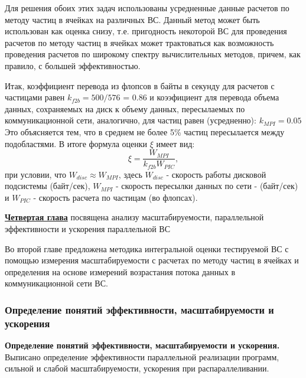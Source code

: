 Для решения обоих этих задач использованы усредненные данные расчетов по методу частиц в ячейках на различных ВС. Данный метод может быть использован как оценка снизу, т.е. пригодность некоторой ВС для проведения расчетов по методу частиц в ячейках может трактоваться как возможность проведения расчетов по широкому спектру вычислительных методов, причем, как правило, с большей эффективностью.

Итак, коэффициент перевода из флопсов в байты в секунду для расчетов с частицами равен
$k_{f2b} = 500/576$ = 0.86   
и коээфициент для перевода объема данных, сохраняемых на диск к объему данных, пересылаемых по коммуникационной сети, аналогично, для частиц равен (усредненно):
$k_{MPI} = 0.05$ 
Это объясняется тем, что в среднем не более 5\% частиц пересылается между подобластями.
В итоге формула оценки $\xi$ имеет вид:
$$
\xi = \frac{W_{MPI}} {k_{f2b} W_{PIC}}, 
$$
при условии, что $W_{disc} \approx W_{MPI}$,
здесь $W_{disc}$ - скорость работы дисковой подсистемы (байт/сек), $W_{MPI}$
- скорость пересылки данных по сети - (байт/сек) и $W_{PIC}$ - скорость расчета по частицам (во флопсах).	

\underline{\textbf{Четвертая глава}} посвящена  
анализу масштабируемости, параллельной эффективности и ускорения параллельной ВС

Во второй главе предложена методика интегральной оценки тестируемой ВС с помощью измерения масштабируемости с расчетах по методу частиц в ячейках и определения на основе измерений возрастания потока данных в коммуникационной сети ВС.

\subsubsection{Определение понятий эффективности, масштабируемости и ускорения}

\textbf{Определение понятий эффективности, масштабируемости и ускорения.}
Выписано определение эффективности параллельной реализации программ, сильной и слабой масштабируемости, ускорения при распараллеливании.

